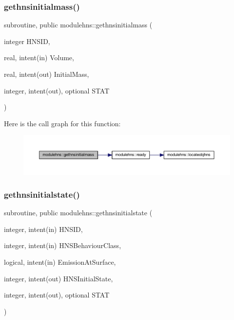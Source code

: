 \subsubsection{\texorpdfstring{gethnsinitialmass()}{gethnsinitialmass()}}
{\footnotesize\ttfamily subroutine, public modulehns\+::gethnsinitialmass (\begin{DoxyParamCaption}\item[{integer}]{H\+N\+S\+ID,  }\item[{real, intent(in)}]{Volume,  }\item[{real, intent(out)}]{Initial\+Mass,  }\item[{integer, intent(out), optional}]{S\+T\+AT }\end{DoxyParamCaption})}

Here is the call graph for this function\+:\nopagebreak
\begin{figure}[H]
\begin{center}
\leavevmode
\includegraphics[width=350pt]{namespacemodulehns_a256a2f0f1c2c0f036a40633b9605bf3d_cgraph}
\end{center}
\end{figure}
\mbox{\label{namespacemodulehns_ade4bb11bbb379ee7bb16ff28af1174e6}} 
\subsubsection{\texorpdfstring{gethnsinitialstate()}{gethnsinitialstate()}}
{\footnotesize\ttfamily subroutine, public modulehns\+::gethnsinitialstate (\begin{DoxyParamCaption}\item[{integer, intent(in)}]{H\+N\+S\+ID,  }\item[{integer, intent(in)}]{H\+N\+S\+Behaviour\+Class,  }\item[{logical, intent(in)}]{Emission\+At\+Surface,  }\item[{integer, intent(out)}]{H\+N\+S\+Initial\+State,  }\item[{integer, intent(out), optional}]{S\+T\+AT }\end{DoxyParamCaption})}

